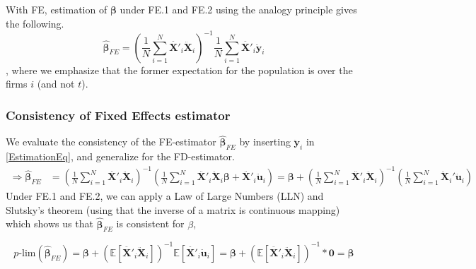With FE, estimation of $\pmb{\beta}$ under FE.1 and FE.2 using the analogy principle gives the following.
\begin{equation} \label{EstimationEq}
    \pmb{\hat{\beta}}_{FE}= \left( \frac{1}{N} \sum_{i=1}^N {\pmb{\ddot{X'}}_{i} \pmb{\ddot{X}}_{i} } \right) ^{-1}\frac{1}{N} \sum_{i=1}^N {\pmb{\ddot{X'}}_{i} \pmb{\ddot{y}}_{i} }
\end{equation}
, where we emphasize that the former expectation for the population is over the firms $i$ (and not $t$).


\subsubsection*{Consistency of Fixed Effects estimator}
We evaluate the consistency of the FE-estimator $\pmb{\hat{\beta}}_{FE}$ by inserting $\pmb{\ddot{y}}_i$ in \eqref{EstimationEq}, and generalize for the FD-estimator.
\begin{align}
    \Rightarrow \pmb{\hat{\beta}}_{FE} &= \left( \frac{1}{N} \sum_{i=1}^N {\pmb{\ddot{X'}}_{i} \pmb{\ddot{X}}_{i} } \right) ^{-1} \left(\frac{1}{N} \sum_{i=1}^N {\pmb{\ddot{X'}}_{i}}\pmb{\ddot{X}}_{i} \pmb{\beta}+\pmb{\ddot{X'}}_{i}\pmb{\ddot{u}}_i \right) \nonumber = \pmb{\beta} +\left( \frac{1}{N} \sum_{i=1}^N {\pmb{\ddot{X'}}_{i} \pmb{\ddot{X}}_{i} } \right) ^{-1} \left( \frac{1}{N} \sum_{i=1}^N {\pmb{\ddot{X}}_i' \pmb{\ddot{u}}_i} \right) \label{FE-estimator}
\end{align}
Under FE.1 and FE.2, we can apply a Law of Large Numbers (LLN) and Slutsky's theorem (using that the inverse of a matrix is continuous mapping) which shows us that $\pmb{\hat{\beta}}_{FE}$ is consistent for $\beta$,

$$p\text{-lim}(\pmb{\hat{\beta}}_{FE})=\pmb{\beta} + \left( \mathbb{E}[\ddot{\pmb{X'}}_i \ddot{\pmb{X}}_i] \right)^{-1}\mathbb{E}[\ddot{\pmb{X'}}_i \ddot{\pmb{u}}_i]=\pmb{\beta} + \left( \mathbb{E}[\ddot{\pmb{X'}}_i \ddot{\pmb{X}}_i] \right)^{-1}*\pmb{0} =\pmb{\beta}$$

